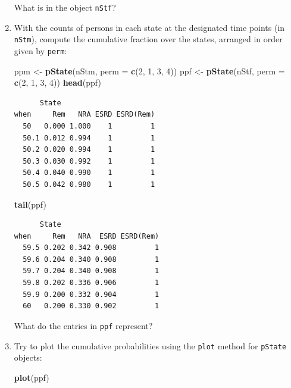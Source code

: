 \documentclass[
]{book}
\newenvironment{Shaded}{\begin{snugshade}}{\end{snugshade}}
\newcommand{\AttributeTok}[1]{\textcolor[rgb]{0.13,0.29,0.53}{#1}}
\newcommand{\DecValTok}[1]{\textcolor[rgb]{0.00,0.00,0.81}{#1}}
\newcommand{\FunctionTok}[1]{\textcolor[rgb]{0.13,0.29,0.53}{\textbf{#1}}}
\newcommand{\NormalTok}[1]{#1}
\newcommand{\OtherTok}[1]{\textcolor[rgb]{0.56,0.35,0.01}{#1}}
\begin{document}
\begin{enumerate}
  What is in the object \texttt{nStf}?
\item
  With the counts of persons in each state at the
  designated time points (in \texttt{nStm}), compute the cumulative
  fraction over the states, arranged in order given by \texttt{perm}:

\begin{Shaded}
\begin{Highlighting}[]
\NormalTok{ppm }\OtherTok{\textless{}{-}} \FunctionTok{pState}\NormalTok{(nStm, }\AttributeTok{perm =} \FunctionTok{c}\NormalTok{(}\DecValTok{2}\NormalTok{, }\DecValTok{1}\NormalTok{, }\DecValTok{3}\NormalTok{, }\DecValTok{4}\NormalTok{))}
\NormalTok{ppf }\OtherTok{\textless{}{-}} \FunctionTok{pState}\NormalTok{(nStf, }\AttributeTok{perm =} \FunctionTok{c}\NormalTok{(}\DecValTok{2}\NormalTok{, }\DecValTok{1}\NormalTok{, }\DecValTok{3}\NormalTok{, }\DecValTok{4}\NormalTok{))}
\FunctionTok{head}\NormalTok{(ppf)}
\end{Highlighting}
\end{Shaded}

\begin{verbatim}
      State
when     Rem   NRA ESRD ESRD(Rem)
  50   0.000 1.000    1         1
  50.1 0.012 0.994    1         1
  50.2 0.020 0.994    1         1
  50.3 0.030 0.992    1         1
  50.4 0.040 0.990    1         1
  50.5 0.042 0.980    1         1
\end{verbatim}

\begin{Shaded}
\begin{Highlighting}[]
\FunctionTok{tail}\NormalTok{(ppf)}
\end{Highlighting}
\end{Shaded}

\begin{verbatim}
      State
when     Rem   NRA  ESRD ESRD(Rem)
  59.5 0.202 0.342 0.908         1
  59.6 0.204 0.340 0.908         1
  59.7 0.204 0.340 0.908         1
  59.8 0.202 0.336 0.906         1
  59.9 0.200 0.332 0.904         1
  60   0.200 0.330 0.902         1
\end{verbatim}

  What do the entries in \texttt{ppf} represent?
\item
  Try to plot the cumulative probabilities using the \texttt{plot} method
  for \texttt{pState} objects:

\begin{Shaded}
\begin{Highlighting}[]
\FunctionTok{plot}\NormalTok{(ppf)}
\end{Highlighting}
\end{Shaded}


\end{enumerate}
\end{document}
